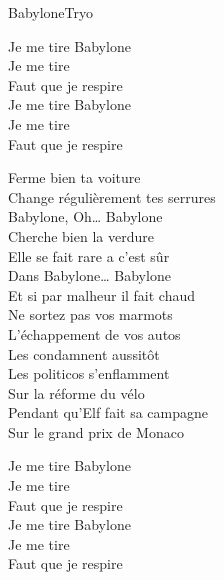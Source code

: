 \documentclass[a4paper,11pt,french]{article}
\begin{document}
\begin{Song}{Babylone}{Tryo}
\begin{multicols}{2}
\begin{Chorus}
Je me tire  Babylone\\
Je me tire \\
Faut que je respire\\
Je me tire  Babylone\\
Je me tire \\
Faut que je respire\\
\end{Chorus}
\columnbreak

\begin{Verse}
Ferme bien ta voiture\\ 
Change régulièrement tes serrures\\
Babylone, Oh… Babylone\\
Cherche bien la verdure \\
Elle se fait rare a c'est sûr\\
Dans Babylone… Babylone\\
Et si par malheur il fait chaud \\
Ne sortez pas vos marmots\\
L'échappement de vos autos\\
Les condamnent aussitôt\\
Les politicos s'enflamment\\
Sur la réforme du vélo\\
Pendant qu'Elf fait sa campagne\\
Sur le grand prix de Monaco\\
\end{Verse}
\espaceInterStrophe

\begin{Chorus}
Je me tire  Babylone\\
Je me tire \\
Faut que je respire\\
Je me tire  Babylone\\
Je me tire \\
Faut que je respire\\
\end{Chorus}
\espaceInterStrophe

\\
\espaceInterStrophe


\end{multicols}
\end{Song}
\end{document}
